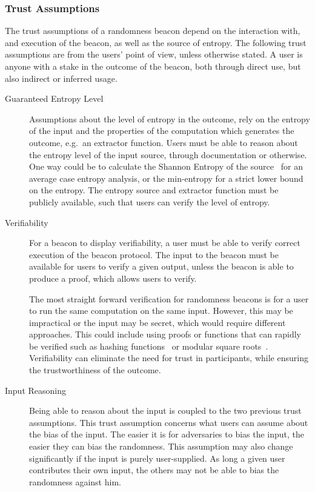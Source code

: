\subsubsection{Trust Assumptions}\label{ssub:trust_assumptions}
The trust assumptions of a randomness beacon depend on the interaction with, and execution of the beacon, as well as the source of entropy.
The following trust assumptions are from the users' point of view, unless otherwise stated.
A user is anyone with a stake in the outcome of the beacon, both through direct use, but also indirect or inferred usage.
\begin{description}

    \item[Guaranteed Entropy Level]
        Assumptions about the level of entropy in the outcome, rely on the entropy of the input and the properties of the computation which generates the outcome, e.g.\ an extractor function.
        Users must be able to reason about the entropy level of the input source, through documentation or otherwise.
        One way could be to calculate the Shannon Entropy of the source~\cite{informationtheory} for an average case entropy analysis, or the min-entropy for a strict lower bound on the entropy.
        The entropy source and extractor function must be publicly available, such that users can verify the level of entropy.

    \item[Verifiability]
        For a beacon to display verifiability, a user must be able to verify correct execution of the beacon protocol.
        The input to the beacon must be available for users to verify a given output, unless the beacon is able to produce a proof, which allows users to verify. 

        The most straight forward verification for randomness beacons is for a user to run the same computation on the same input.
        However, this may be impractical or the input may be secret, which  would require different approaches.
        This could include using proofs or functions that can rapidly be verified such as hashing functions~\cite{nakamoto2008bitcoin} or modular square roots~\cite{lenstra2015random}.
        Verifiability can eliminate the need for trust in participants, while ensuring the trustworthiness of the outcome.

    \item[Input Reasoning]
        Being able to reason about the input is coupled to the two previous trust assumptions.
        This trust assumption concerns what users can assume about the bias of the input.
        The easier it is for adversaries to bias the input, the easier they can bias the randomness.
        This assumption may also change significantly if the input is purely user-supplied.
        As long a given user contributes their own input, the others may not be able to bias the randomness against him.

\end{description}

